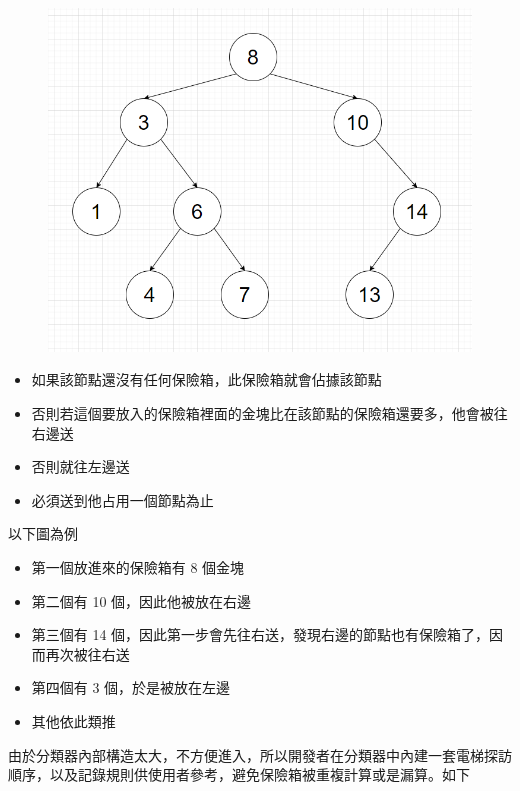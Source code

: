     \begin{figure}[h]
        \includegraphics[width=\textwidth]{../Images/SaveSorter.png}
    \end{figure}

    \begin{itemize}
        \item 如果該節點還沒有任何保險箱，此保險箱就會佔據該節點
        \item 否則若這個要放入的保險箱裡面的金塊比在該節點的保險箱還要多，他會被往右邊送
        \item 否則就往左邊送
        \item 必須送到他占用一個節點為止
    \end{itemize}

    以下圖為例

    \begin{itemize}
        \item 第一個放進來的保險箱有 8 個金塊
        \item 第二個有 10 個，因此他被放在右邊
        \item 第三個有 14 個，因此第一步會先往右送，發現右邊的節點也有保險箱了，因而再次被往右送
        \item 第四個有 3 個，於是被放在左邊
        \item 其他依此類推
    \end{itemize}

    由於分類器內部構造太大，不方便進入，所以開發者在分類器中內建一套電梯探訪順序，以及記錄規則供使用者參考，避免保險箱被重複計算或是漏算。如下

